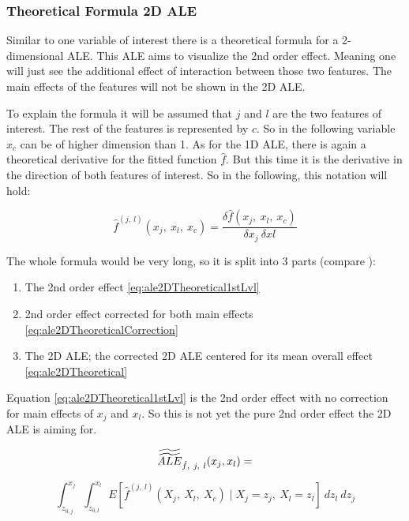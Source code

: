 \documentclass[
]{krantz}
\begin{document}
\hypertarget{theoretical-formula-2d-ale}{%
\subsubsection{Theoretical Formula 2D ALE}\label{theoretical-formula-2d-ale}}

Similar to one variable of interest there is a theoretical formula for a 2-dimensional ALE. This ALE aims to visualize the 2nd order effect. Meaning one will just see the additional effect of interaction between those two features. The main effects of the features will not be shown in the 2D ALE.

To explain the formula it will be assumed that \(j\) and \(l\) are the two features of interest. The rest of the features is represented by \(c\). So in the following variable \(x_c\) can be of higher dimension than 1. As for the 1D ALE, there is again a theoretical derivative for the fitted function \(\hat{f}\). But this time it is the derivative in the direction of both features of interest. So in the following, this notation will hold:

\[ \hat{f}^{(j,~l)}(x_j,~x_l,~x_c) = \frac{\delta\hat{f}(x_j,~x_l,~x_c)}{\delta x_j~ \delta xl}\]

The whole formula would be very long, so it is split into 3 parts (compare \citep[page 8]{Apley2016}):

\begin{enumerate}
\def\labelenumi{\arabic{enumi}.}
\item
  The 2nd order effect \eqref{eq:ale2DTheoretical1stLvl}
\item
  2nd order effect corrected for both main effects \eqref{eq:ale2DTheoreticalCorrection}
\item
  The 2D ALE; the corrected 2D ALE centered for its mean overall effect \eqref{eq:ale2DTheoretical}
\end{enumerate}

Equation \eqref{eq:ale2DTheoretical1stLvl} is the 2nd order effect with no correction for main effects of \(x_j\) and \(x_l\). So this is not yet the pure 2nd order effect the 2D ALE is aiming for.

\begin{equation} 
\widetilde{\widetilde{ALE}}_{\hat{f},~j,~l}(x_j, x_l) = \notag
\end{equation}

\begin{equation}
\int_{z_{0,j}}^{x_j}  \int_{z_{0,l}}^{x_l} E[\hat{f}^{(j,~l)}(X_j,~X_l,~X_c)\mid X_j = z_j,~X_l = z_l]~dz_l~dz_j 
  \label{eq:ale2DTheoretical1stLvl}
\end{equation}
\end{document}
